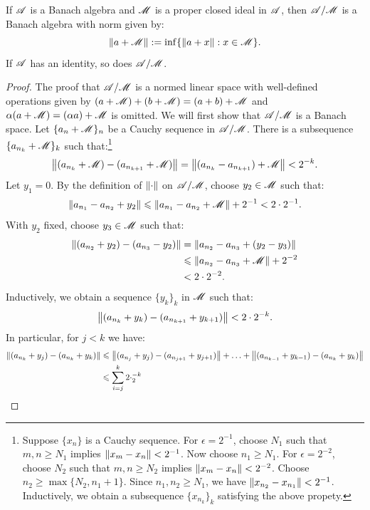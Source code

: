 \begin{theorem}\label{thm:qib}
	If $\mathscr{A}$ is a Banach algebra and $\mathscr{M}$ is a proper closed ideal in $\mathscr{A}$, then $\mathscr{A}/\mathscr{M}$ is a Banach algebra with norm given by:
	\[
		\left\lVert a + \mathscr{M} \right\rVert := \inf \{\left\lVert a + x \right\rVert : x \in \mathscr{M}\}.
	\] 
	If $\mathscr{A}$ has an identity, so does $\mathscr{A}/\mathscr{M}$.
\end{theorem}
	\begin{proof}
		The proof that $\mathscr{A}/\mathscr{M}$ is a normed linear space with well-defined operations given by $(a+\mathscr{M}) + (b+\mathscr{M}) = (a+b) + \mathscr{M}$ and $\alpha(a+\mathscr{M}) = (\alpha a) + \mathscr{M}$ is omitted. We will first show that $\mathscr{A}/\mathscr{M}$ is a Banach space. Let $\{a_n + \mathscr{M}\}_n$ be a Cauchy sequence in $\mathscr{A}/\mathscr{M}$. There is a subsequence $\{a_{n_k} + \mathscr{M}\}_k$ such that:\footnote{Suppose $\{x_n\}$ is a Cauchy sequence. For $\epsilon = 2^{-1}$, choose $N_1$ such that $m,n \geq N_1$ implies $\left\lVert x_m - x_n \right\rVert < 2^{-1}$. Now choose $n_1 \geq N_1$. For $\epsilon = 2^{-2}$, choose $N_2$ such that $m,n \geq N_2$ implies $\left\lVert x_m - x_n \right\rVert < 2^{-2}$. Choose $n_2 \geq \max \{N_2, n_1 + 1\}$. Since $n_1, n_2 \geq N_1$, we have $\left\lVert x_{n_2} - x_{n_1} \right\rVert < 2^{-1}$. Inductively, we obtain a subsequence $\{x_{n_k}\}_k$ satisfying the above propety. }
		\[
			\left\lVert (a_{n_k} + \mathscr{M}) - (a_{n_{k+1}} + \mathscr{M})\right\rVert = \left\lVert (a_{n_k} - a_{n_{k+1}}) + \mathscr{M} \right\rVert < 2^{-k}.	
		\] 
		Let $y_1 = 0$. By the definition of $\left\lVert \cdot \right\rVert$ on $\mathscr{A}/\mathscr{M}$, choose $y_2 \in \mathscr{M}$ such that:
		\[
			\left\lVert a_{n_1} - a_{n_2} + y_2 \right\rVert \leqslant \left\lVert a_{n_1} - a_{n_2} + \mathscr{M} \right\rVert + 2^{-1} < 2 \cdot 2^{-1}.
		\] 
		With $y_2$ fixed, choose $y_3 \in \mathscr{M}$ such that:
		\begin{align*}
			\left\lVert (a_{n_2} + y_2) - (a_{n_3} - y_2) \right\rVert
			&= \left\lVert a_{n_2} - a_{n_3} + (y_2 - y_3) \right\rVert \\
			&\leqslant \left\lVert a_{n_2} - a_{n_3} + \mathscr{M} \right\rVert + 2^{-2}  \\
			&< 2 \cdot 2^{-2}.
		\end{align*}
		Inductively, we obtain a sequence $\{y_k\}_k$ in $\mathscr{M}$ such that:
		\[
			\left\lVert (a_{n_k} + y_k) - (a_{n_{k+1}} + y_{k+1}) \right\rVert < 2 \cdot 2^{-k}.
		\] 
		In particular, for $j < k$ we have:
		\begin{align*}
			\lnorm (a_{n_k} + y_j) - (a_{n_k} + y_k) \rnorm
			&\leq \lnorm (a_{n_j} + y_j)-(a_{n_{j+1}} + y_{j+1}) \rnorm + \ldots +\lnorm (a_{n_{k-1}} + y_{k-1}) - (a_{n_k} + y_k) \rnorm  \\
			&\leq \sum_{i=j}^{k} 2\cdot_2^{-k}  \\

\end{align*}
\end{proof}
